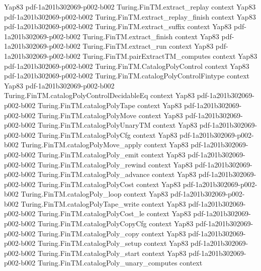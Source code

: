 \begin{theorem}
  {Yap83}
  {pdf-1a201b302069-p002-b002}
\proofstep
  {Turing.FinTM.extract_replay}
  {context}
  {Yap83}
  {pdf-1a201b302069-p002-b002}
\proofstep
  {Turing.FinTM.extract_replay_finish}
  {context}
  {Yap83}
  {pdf-1a201b302069-p002-b002}
\proofstep
  {Turing.FinTM.extract_suffix}
  {context}
  {Yap83}
  {pdf-1a201b302069-p002-b002}
\proofstep
  {Turing.FinTM.extract_finish}
  {context}
  {Yap83}
  {pdf-1a201b302069-p002-b002}
\proofstep
  {Turing.FinTM.extract_run}
  {context}
  {Yap83}
  {pdf-1a201b302069-p002-b002}
\proofstep
  {Turing.FinTM.pairExtractTM_computes}
  {context}
  {Yap83}
  {pdf-1a201b302069-p002-b002}
\proofstep
  {Turing.FinTM.CatalogPolyControl}
  {context}
  {Yap83}
  {pdf-1a201b302069-p002-b002}
\proofstep
  {Turing.FinTM.catalogPolyControlFintype}
  {context}
  {Yap83}
  {pdf-1a201b302069-p002-b002}
\proofstep
  {Turing.FinTM.catalogPolyControlDecidableEq}
  {context}
  {Yap83}
  {pdf-1a201b302069-p002-b002}
\proofstep
  {Turing.FinTM.catalogPolyTape}
  {context}
  {Yap83}
  {pdf-1a201b302069-p002-b002}
\proofstep
  {Turing.FinTM.catalogPolyMove}
  {context}
  {Yap83}
  {pdf-1a201b302069-p002-b002}
\proofstep
  {Turing.FinTM.catalogPolyUnaryTM}
  {context}
  {Yap83}
  {pdf-1a201b302069-p002-b002}
\proofstep
  {Turing.FinTM.catalogPolyCfg}
  {context}
  {Yap83}
  {pdf-1a201b302069-p002-b002}
\proofstep
  {Turing.FinTM.catalogPolyMove_apply}
  {context}
  {Yap83}
  {pdf-1a201b302069-p002-b002}
\proofstep
  {Turing.FinTM.catalogPoly_emit}
  {context}
  {Yap83}
  {pdf-1a201b302069-p002-b002}
\proofstep
  {Turing.FinTM.catalogPoly_rewind}
  {context}
  {Yap83}
  {pdf-1a201b302069-p002-b002}
\proofstep
  {Turing.FinTM.catalogPoly_advance}
  {context}
  {Yap83}
  {pdf-1a201b302069-p002-b002}
\proofstep
  {Turing.FinTM.catalogPolyCost}
  {context}
  {Yap83}
  {pdf-1a201b302069-p002-b002}
\proofstep
  {Turing.FinTM.catalogPoly_loop}
  {context}
  {Yap83}
  {pdf-1a201b302069-p002-b002}
\proofstep
  {Turing.FinTM.catalogPolyTape_write}
  {context}
  {Yap83}
  {pdf-1a201b302069-p002-b002}
\proofstep
  {Turing.FinTM.catalogPolyCost_le}
  {context}
  {Yap83}
  {pdf-1a201b302069-p002-b002}
\proofstep
  {Turing.FinTM.catalogPolyCopyCfg}
  {context}
  {Yap83}
  {pdf-1a201b302069-p002-b002}
\proofstep
  {Turing.FinTM.catalogPoly_copy}
  {context}
  {Yap83}
  {pdf-1a201b302069-p002-b002}
\proofstep
  {Turing.FinTM.catalogPoly_setup}
  {context}
  {Yap83}
  {pdf-1a201b302069-p002-b002}
\proofstep
  {Turing.FinTM.catalogPoly_start}
  {context}
  {Yap83}
  {pdf-1a201b302069-p002-b002}
\proofstep
  {Turing.FinTM.catalogPoly_unary_computes}
  {context}

\end{theorem}
